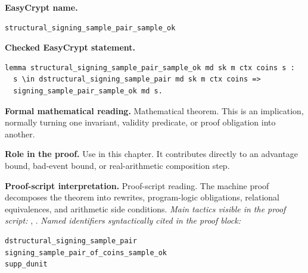 \begin{formaltheorem}
\noindent\textbf{EasyCrypt name.}
\begin{lstlisting}[language=EasyCrypt,basicstyle=\ttfamily\scriptsize]
structural_signing_sample_pair_sample_ok
\end{lstlisting}
\noindent\textbf{Checked EasyCrypt statement.}
\begin{lstlisting}[language=EasyCrypt,basicstyle=\ttfamily\scriptsize]
lemma structural_signing_sample_pair_sample_ok md sk m ctx coins s :
  s \in dstructural_signing_sample_pair md sk m ctx coins =>
  signing_sample_pair_sample_ok md s.
\end{lstlisting}
\noindent\textbf{Formal mathematical reading.}
Mathematical theorem. This is an implication, normally turning one invariant, validity predicate, or proof obligation into another.

\noindent\textbf{Role in the proof.}
Use in this chapter. It contributes directly to an advantage bound, bad-event bound, or real-arithmetic composition step.

\noindent\textbf{Proof-script interpretation.}
Proof-script reading. The machine proof decomposes the theorem into rewrites, program-logic obligations, relational equivalences, and arithmetic side conditions.
\emph{Main tactics visible in the proof script:} , .
\emph{Named identifiers syntactically cited in the proof block:}
\begin{lstlisting}[language=EasyCrypt,basicstyle=\ttfamily\scriptsize]
dstructural_signing_sample_pair
signing_sample_pair_of_coins_sample_ok
supp_dunit
\end{lstlisting}

\end{formaltheorem}


